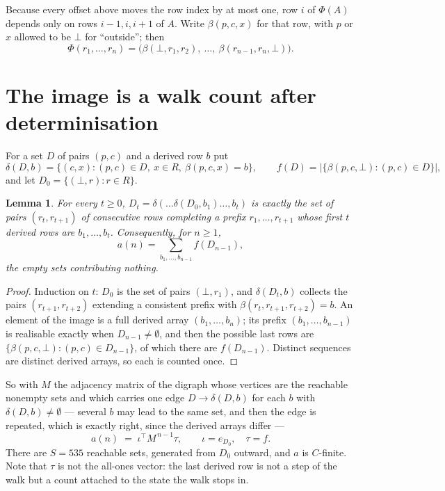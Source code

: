 \documentclass[11pt,a4paper]{article}
\theoremstyle{plain}
\newtheorem{lemma}[theorem]{Lemma}
\theoremstyle{definition}
\begin{document}
Because every offset above moves the row index by at most one, row $i$ of
$\Phi(A)$ depends only on rows $i-1,i,i+1$ of $A$. Write $\beta(p,c,x)$ for that row, with $p$
or $x$ allowed to be $\bot$ for ``outside''; then
\[
\Phi(r_1,\dots,r_n)=\bigl(\beta(\bot,r_1,r_2),\ \dots,\ \beta(r_{n-1},r_n,\bot)\bigr).
\]

\section{The image is a walk count after determinisation}

For a set $D$ of pairs $(p,c)$ and a derived row $b$ put
\[
\delta(D,b)=\{(c,x):(p,c)\in D,\ x\in R,\ \beta(p,c,x)=b\},\qquad
f(D)=\bigl|\{\beta(p,c,\bot):(p,c)\in D\}\bigr| ,
\]
and let $D_0=\{(\bot,r):r\in R\}$.

\begin{lemma}\label{lem:det}
For every $t\ge0$, $D_t=\delta(\dots\delta(D_0,b_1)\dots,b_t)$ is exactly the set of pairs
$(r_t,r_{t+1})$ of consecutive rows completing a prefix $r_1,\dots,r_{t+1}$ whose first $t$
derived rows are $b_1,\dots,b_t$. Consequently, for $n\ge1$,
\[
a(n)=\sum_{b_1,\dots,b_{n-1}}f(D_{n-1}),
\]
the empty sets contributing nothing.
\end{lemma}

\begin{proof}
Induction on $t$: $D_0$ is the set of pairs $(\bot,r_1)$, and $\delta(D_t,b)$ collects the
pairs $(r_{t+1},r_{t+2})$ extending a consistent prefix with
$\beta(r_t,r_{t+1},r_{t+2})=b$. An element of the image is a full derived array
$(b_1,\dots,b_n)$; its prefix $(b_1,\dots,b_{n-1})$ is realisable exactly when
$D_{n-1}\neq\emptyset$, and then the possible last rows are
$\{\beta(p,c,\bot):(p,c)\in D_{n-1}\}$, of which there are $f(D_{n-1})$. Distinct sequences
are distinct derived arrays, so each is counted once.
\end{proof}

So with $M$ the adjacency matrix of the digraph whose vertices are the reachable nonempty sets
and which carries one edge $D\to\delta(D,b)$ for each $b$ with $\delta(D,b)\neq\emptyset$ ---
several $b$ may lead to the same set, and then the edge is repeated, which is exactly right,
since the derived arrays differ ---
\[
a(n)\;=\;\iota^{\!\top}M^{\,n-1}\tau,\qquad \iota=e_{D_0},\quad \tau=f .
\]
There are $S=535$ reachable sets, generated from $D_0$ outward, and $a$ is $C$-finite.
Note that $\tau$ is not the all-ones vector: the last derived row is not a
step of the walk but a count attached to the state the walk stops in.
\end{document}
